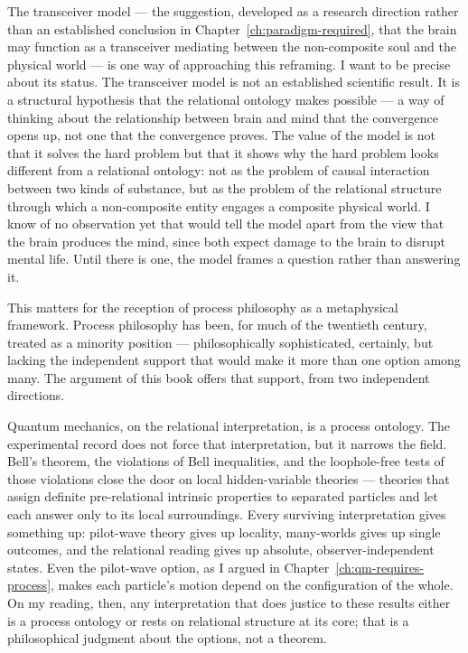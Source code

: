 The transceiver model --- the suggestion, developed as a research direction rather
than an established conclusion in Chapter~\ref{ch:paradigm-required}, that the
brain may function as a
transceiver mediating between the non-composite soul and the physical world ---
is one way of approaching this reframing.  I want to be precise about its status.
The transceiver model is not an established scientific result.  It is a
structural hypothesis that the relational ontology makes possible --- a way of
thinking about the relationship between brain and mind that the convergence opens
up, not one that the convergence proves.  The value of the model is not that it
solves the hard problem but that it shows why the hard problem looks different
from a relational ontology: not as the problem of causal interaction between two
kinds of substance, but as the problem of the relational structure through which
a non-composite entity engages a composite physical world.  I know of no
observation yet that would tell the model apart from the view that the brain
produces the mind, since both expect damage to the brain to disrupt mental
life.  Until there is one, the model frames a question rather than answering it.

This matters for the reception of process philosophy as a metaphysical framework.
Process philosophy has been, for much of the twentieth century, treated as a
minority position --- philosophically sophisticated, certainly, but lacking the
independent support that would make it more than one option among many.  The
argument of this book offers that support, from two independent directions.

Quantum mechanics, on the relational interpretation, is a process ontology.  The
experimental record does not force that interpretation, but it narrows the
field.  Bell's theorem, the violations of Bell inequalities, and the
loophole-free tests of those violations \citep{Aspect1982,Zeilinger2023Nobel}
close the door on local hidden-variable theories --- theories that assign
definite pre-relational intrinsic properties to separated particles and let
each answer only to its local surroundings.  Every surviving interpretation
gives something up: pilot-wave theory gives up locality, many-worlds gives up
single outcomes, and the relational reading gives up absolute,
observer-independent states.  Even the pilot-wave option, as I argued in
Chapter~\ref{ch:qm-requires-process}, makes each particle's motion depend on
the configuration of the whole.  On my reading, then, any interpretation that
does justice to these results either is a process ontology or rests on
relational structure at its core; that is a philosophical judgment about the
options, not a theorem.

